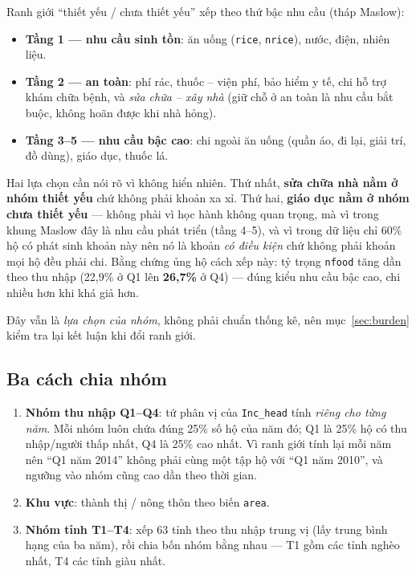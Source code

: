 \documentclass[11pt,a4paper]{article}
\newcommand{\n}[1]{\textbf{#1}}
\begin{document}
Ranh giới “thiết yếu / chưa thiết yếu” xếp theo thứ bậc nhu cầu (tháp Maslow):

\begin{itemize}[leftmargin=1.2em,itemsep=2pt,topsep=2pt]
\item \n{Tầng 1 — nhu cầu sinh tồn}: ăn uống (\texttt{rice}, \texttt{nrice}), nước, điện, nhiên liệu.
\item \n{Tầng 2 — an toàn}: phí rác, thuốc – viện phí, bảo hiểm y tế, chi hỗ trợ khám chữa bệnh, và \emph{sửa chữa – xây nhà} (giữ chỗ ở an toàn là nhu cầu bắt buộc, không hoãn được khi nhà hỏng).
\item \n{Tầng 3–5 — nhu cầu bậc cao}: chi ngoài ăn uống (quần áo, đi lại, giải trí, đồ dùng), giáo dục, thuốc lá.
\end{itemize}

Hai lựa chọn cần nói rõ vì không hiển nhiên. Thứ nhất, \n{sửa chữa nhà nằm ở nhóm thiết yếu} chứ không phải khoản xa xỉ. Thứ hai, \n{giáo dục nằm ở nhóm chưa thiết yếu} — không phải vì học hành không quan trọng, mà vì trong khung Maslow đây là nhu cầu phát triển (tầng 4–5), và vì trong dữ liệu chỉ 60\% hộ có phát sinh khoản này nên nó là khoản \emph{có điều kiện} chứ không phải khoản mọi hộ đều phải chi. Bằng chứng ủng hộ cách xếp này: tỷ trọng \texttt{nfood} tăng dần theo thu nhập (22,9\% ở Q1 lên \n{26,7\%} ở Q4) — đúng kiểu nhu cầu bậc cao, chi nhiều hơn khi khá giả hơn.

Đây vẫn là \emph{lựa chọn của nhóm}, không phải chuẩn thống kê, nên mục~\ref{sec:burden} kiểm tra lại kết luận khi đổi ranh giới.

\subsection{Ba cách chia nhóm}\label{sec:groups}
\begin{enumerate}[leftmargin=1.4em,itemsep=3pt,topsep=2pt]
\item \n{Nhóm thu nhập Q1–Q4}: tứ phân vị của \texttt{Inc\_head} tính \emph{riêng cho từng năm}. Mỗi nhóm luôn chứa đúng 25\% số hộ của năm đó; Q1 là 25\% hộ có thu nhập/người thấp nhất, Q4 là 25\% cao nhất. Vì ranh giới tính lại mỗi năm nên “Q1 năm 2014” không phải cùng một tập hộ với “Q1 năm 2010”, và ngưỡng vào nhóm cũng cao dần theo thời gian.
\item \n{Khu vực}: thành thị / nông thôn theo biến \texttt{area}.
\item \n{Nhóm tỉnh T1–T4}: xếp 63 tỉnh theo thu nhập trung vị (lấy trung bình hạng của ba năm), rồi chia bốn nhóm bằng nhau — T1 gồm các tỉnh nghèo nhất, T4 các tỉnh giàu nhất.
\end{enumerate}
\end{document}
